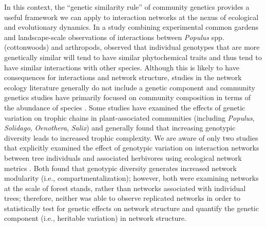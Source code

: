 \documentclass[fleqn,12pt]{olplainarticle}
\begin{document}
In this context, the ``genetic similarity rule'' of community genetics
provides a useful framework we can apply to interaction networks at
the nexus of ecological and evolutionary dynamics. In a study
combining experimental common gardens and landscape-scale observations
of interactions between \textit{Populus} spp.  (cottonwoods) and
arthropods, \cite{Bangert2006} observed that individual genotypes that
are more genetically similar will tend to have similar phytochemical
traits and thus tend to have similar interactions with other
species. Although this is likely to have consequences for interactions
and network structure, studies in the network ecology literature
generally do not include a genetic component \citep{Lau2017a} and
community genetics studies have primarily focused on community
composition in terms of the abundance of species
\citep{DesRoches2018TheVariation}. Some studies have examined the
effects of genetic variation on trophic chains in plant-associated
communities (including \textit{Populus}, \textit{Solidago},
\textit{Oenothera}, \textit{Salix})
\citep{Bailey2005ImportanceInteractions, Johnson2008, Smith2011,
  Smith2015b, Barbour2016GeneticComplexity} and generally found that
increasing genotypic diversity leads to increased trophic
complexity. We are aware of only two studies that explicitly examined
the effect of genotypic variation on interaction networks between tree
individuals and associated herbivores using ecological network metrics
\citep{Lau2016afix, Keith2017}. Both found that genotypic diversity
generates increased network modularity (i.e., compartmentalization);
however, both were examining networks at the scale of forest stands,
rather than networks associated with individual trees; therefore,
neither was able to observe replicated networks in order to
statistically test for genetic effects on network structure and
quantify the genetic component (i.e., heritable variation) in network
structure.
\end{document}
